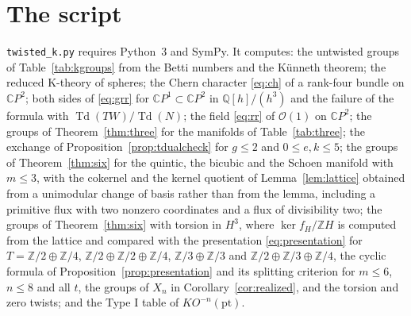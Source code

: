 \documentclass[reqno,11pt]{amsart}
\theoremstyle{definition}
\newcommand{\ZZ}{\mathbb{Z}}
\newcommand{\QQ}{\mathbb{Q}}
\newcommand{\CC}{\mathbb{C}}
\newcommand{\Td}{\operatorname{Td}}
\begin{document}
\section{The script}\label{app:code}
\texttt{twisted\_k.py} requires Python~3 and SymPy. It computes: the untwisted groups of Table~\ref{tab:kgroups} from the Betti numbers and the K\"unneth theorem; the reduced K-theory of spheres; the Chern character \eqref{eq:ch} of a rank-four bundle on $\CC P^2$; both sides of \eqref{eq:grr} for $\CC P^1\subset\CC P^2$ in $\QQ[h]/(h^3)$ and the failure of the formula with $\Td(TW)/\Td(N)$; the field \eqref{eq:rr} of $\mathcal O(1)$ on $\CC P^2$; the groups of Theorem~\ref{thm:three} for the manifolds of Table~\ref{tab:three}; the exchange of Proposition~\ref{prop:tdualcheck} for $g\le2$ and $0\le e,k\le5$; the groups of Theorem~\ref{thm:six} for the quintic, the bicubic and the Schoen manifold with $m\le3$, with the cokernel and the kernel quotient of Lemma~\ref{lem:lattice} obtained from a unimodular change of basis rather than from the lemma, including a primitive flux with two nonzero coordinates and a flux of divisibility two; the groups of Theorem~\ref{thm:six} with torsion in $H^3$, where $\ker f_H/\ZZ H$ is computed from the lattice and compared with the presentation \eqref{eq:presentation} for $T=\ZZ/2\oplus\ZZ/4$, $\ZZ/2\oplus\ZZ/2\oplus\ZZ/4$, $\ZZ/3\oplus\ZZ/3$ and $\ZZ/2\oplus\ZZ/3\oplus\ZZ/4$, the cyclic formula of Proposition~\ref{prop:presentation} and its splitting criterion for $m\le6$, $n\le8$ and all $t$, the groups of $X_n$ in Corollary~\ref{cor:realized}, and the torsion and zero twists; and the Type I table of $KO^{-n}(\mathrm{pt})$.
\end{document}
